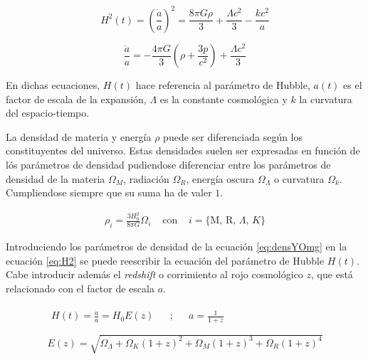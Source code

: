 \documentclass[twoside]{article}
\begin{document}
				\begin{equation}
					H^2(t) = \left(\frac{\dot{a}}{a} \right)^2 = \frac{8 \pi G \rho} {3} + \frac{\Lambda c^2}{3} - \frac{kc^2}{a}
					\label{eq:H2}
				\end{equation}

				\begin{equation}
					\frac{\ddot{a}}{a} = - \frac{4\pi G}{3} \left(\rho+\frac{3p}{c^2}\right) + \frac{\Lambda c^2}{3}
					\label{eq:addot}
				\end{equation}

			En dichas ecuaciones, $H(t)$ hace referencia al parámetro de Hubble, $a(t)$ es el factor de escala de la expansión, $\Lambda$ es la constante cosmológica y $k$ la curvatura del espacio-tiempo.

			La densidad de materia y energía $\rho$ puede ser diferenciada según los constituyentes del universo. Estas densidades suelen ser expresadas en función de lós parámetros de densidad pudiendose diferenciar entre los parámetros de densidad de la materia $\Omega_{M}$, radiación $\Omega_{R}$, energía oscura $\Omega_{\Lambda}$ o curvatura $\Omega_{k}$. Cumpliendose siempre que su suma ha de valer $1$.

				\begin{equation}
					\begin{matrix}
						\rho_i = \frac{3H_0^2}{8\pi G} \Omega_i & \textrm{ con } & i = \{\textrm{M, R, } \Lambda \textrm{, }K\}
					\end{matrix}
					\label{eq:densYOmg}
				\end{equation}

			Introduciendo los parámetros de densidad de la ecuación \ref{eq:densYOmg} en la ecuación \ref{eq:H2} se puede reescribir la ecuación del parámetro de Hubble $H(t)$. Cabe introducir además el \textit{redshift} o corrimiento al rojo cosmológico $z$, que está relacionado con el factor de escala $a$.

				\begin{equation}
					\begin{matrix}
						\begin{matrix}
						H(t) = \frac{\dot{a}}{a} = H_0 E(z) & & ; & & a = \frac{1}{1+z}
						\end{matrix}  \\ \\
						E(z) = \sqrt{\Omega_{\Lambda} + \Omega_{K}(1+z)^2 + \Omega_{M}(1+z)^3 + \Omega_{R}(1+z)^4}
					\end{matrix}
					\label{eq:EDOa}
				\end{equation}
\end{document}
